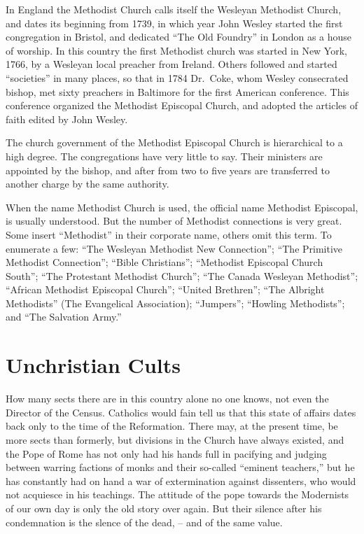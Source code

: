 \documentclass[
]{book}
\begin{document}
In England the Methodist Church calls itself the Wesleyan Methodist Church, and dates its beginning from 1739, in which year John Wesley started the first congregation in Bristol, and dedicated ``The Old Foundry'' in London as a house of worship. In this country the first Methodist church was started in New York, 1766, by a Wesleyan local preacher from Ireland. Others followed and started ``societies'' in many places, so that in 1784 Dr.~Coke, whom Wesley consecrated bishop, met sixty preachers in Baltimore for the first American conference. This conference organized the Methodist Episcopal Church, and adopted the articles of faith edited by John Wesley.

The church government of the Methodist Episcopal Church is hierarchical to a high degree. The congregations have very little to say. Their ministers are appointed by the bishop, and after from two to five years are transferred to another charge by the same authority.

When the name Methodist Church is used, the official name Methodist Episcopal, is usually understood. But the number of Methodist connections is very great. Some insert ``Methodist'' in their corporate name, others omit this term. To enumerate a few: ``The Wesleyan Methodist New Connection''; ``The Primitive Methodist Connection''; ``Bible Christians''; ``Methodist Episcopal Church South''; ``The Protestant Methodist Church''; ``The Canada Wesleyan Methodist''; ``African Methodist Episcopal Church''; ``United Brethren''; ``The Albright Methodists'' (The Evangelical Association); ``Jumpers''; ``Howling Methodists''; and ``The Salvation Army.''

\hypertarget{unchristian-cults}{%
\section{Unchristian Cults}\label{unchristian-cults}}

How many sects there are in this country alone no one knows, not even the Director of the Census. Catholics would fain tell us that this state of affairs dates back only to the time of the Reformation. There may, at the present time, be more sects than formerly, but divisions in the Church have always existed, and the Pope of Rome has not only had his hands full in pacifying and judging between warring factions of monks and their so-called ``eminent teachers,'' but he has constantly had on hand a war of extermination against dissenters, who would not acquiesce in his teachings. The attitude of the pope towards the Modernists of our own day is only the old story over again. But their silence after his condemnation is the slence of the dead, -- and of the same value.
\end{document}
